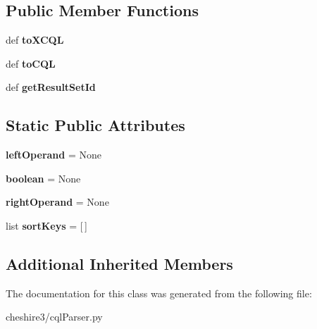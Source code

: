 \subsection*{Public Member Functions}
\begin{DoxyCompactItemize}
\item 
\hypertarget{classcheshire3_1_1cql_parser_1_1_triple_a28221928b6ff01fb3cd03445fb574237}{def {\bfseries to\-X\-C\-Q\-L}}\label{classcheshire3_1_1cql_parser_1_1_triple_a28221928b6ff01fb3cd03445fb574237}

\item 
\hypertarget{classcheshire3_1_1cql_parser_1_1_triple_abdd7eefbd24e3d39953fba02d507280f}{def {\bfseries to\-C\-Q\-L}}\label{classcheshire3_1_1cql_parser_1_1_triple_abdd7eefbd24e3d39953fba02d507280f}

\item 
\hypertarget{classcheshire3_1_1cql_parser_1_1_triple_a7800e46a2ef5812c8e1cd2f14c726c87}{def {\bfseries get\-Result\-Set\-Id}}\label{classcheshire3_1_1cql_parser_1_1_triple_a7800e46a2ef5812c8e1cd2f14c726c87}

\end{DoxyCompactItemize}
\subsection*{Static Public Attributes}
\begin{DoxyCompactItemize}
\item 
\hypertarget{classcheshire3_1_1cql_parser_1_1_triple_ade5a147b05f063f563abdb494ac31d45}{{\bfseries left\-Operand} = None}\label{classcheshire3_1_1cql_parser_1_1_triple_ade5a147b05f063f563abdb494ac31d45}

\item 
\hypertarget{classcheshire3_1_1cql_parser_1_1_triple_ab3aab68db3aa03ccf56f7109b7c8b8cb}{{\bfseries boolean} = None}\label{classcheshire3_1_1cql_parser_1_1_triple_ab3aab68db3aa03ccf56f7109b7c8b8cb}

\item 
\hypertarget{classcheshire3_1_1cql_parser_1_1_triple_a8615365fc6b6e5ceee06d84eac79ab7a}{{\bfseries right\-Operand} = None}\label{classcheshire3_1_1cql_parser_1_1_triple_a8615365fc6b6e5ceee06d84eac79ab7a}

\item 
\hypertarget{classcheshire3_1_1cql_parser_1_1_triple_ac26408692c8b511f39c6a7c7e2a09709}{list {\bfseries sort\-Keys} = \mbox{[}$\,$\mbox{]}}\label{classcheshire3_1_1cql_parser_1_1_triple_ac26408692c8b511f39c6a7c7e2a09709}

\end{DoxyCompactItemize}
\subsection*{Additional Inherited Members}


The documentation for this class was generated from the following file\-:\begin{DoxyCompactItemize}
\item 
cheshire3/cql\-Parser.\-py\end{DoxyCompactItemize}
